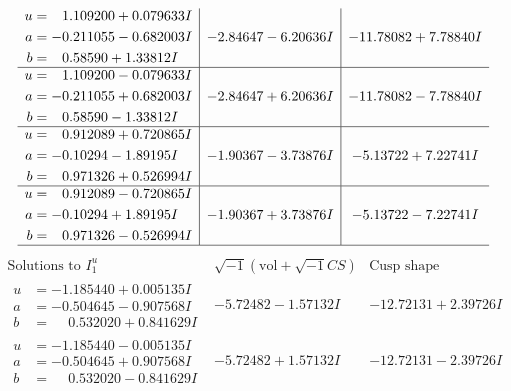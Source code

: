 \documentclass[1p]{elsarticle_modified}
\theoremstyle{definition}
\newcommand{\I}{\sqrt{-1}}
\begin{document}
$$\begin{array}{c|c|c}
\begin{aligned}
u &= \phantom{-}1.109200 + 0.079633 I \\
a &= -0.211055 - 0.682003 I \\
b &= \phantom{-}0.58590 + 1.33812 I\end{aligned}
 & -2.84647 - 6.20636 I & -11.78082 + 7.78840 I \\ \hline\begin{aligned}
u &= \phantom{-}1.109200 - 0.079633 I \\
a &= -0.211055 + 0.682003 I \\
b &= \phantom{-}0.58590 - 1.33812 I\end{aligned}
 & -2.84647 + 6.20636 I & -11.78082 - 7.78840 I \\ \hline\begin{aligned}
u &= \phantom{-}0.912089 + 0.720865 I \\
a &= -0.10294 - 1.89195 I \\
b &= \phantom{-}0.971326 + 0.526994 I\end{aligned}
 & -1.90367 - 3.73876 I & -5.13722 + 7.22741 I \\ \hline\begin{aligned}
u &= \phantom{-}0.912089 - 0.720865 I \\
a &= -0.10294 + 1.89195 I \\
b &= \phantom{-}0.971326 - 0.526994 I\end{aligned}
 & -1.90367 + 3.73876 I & -5.13722 - 7.22741 I\\
 \hline 
 \end{array}$$\newpage$$\begin{array}{c|c|c}  
\text{Solutions to }I^u_{1}& \I (\text{vol} + \sqrt{-1}CS) & \text{Cusp shape}\\
 \hline 
\begin{aligned}
u &= -1.185440 + 0.005135 I \\
a &= -0.504645 - 0.907568 I \\
b &= \phantom{-}0.532020 + 0.841629 I\end{aligned}
 & -5.72482 - 1.57132 I & -12.72131 + 2.39726 I \\ \hline\begin{aligned}
u &= -1.185440 - 0.005135 I \\
a &= -0.504645 + 0.907568 I \\
b &= \phantom{-}0.532020 - 0.841629 I\end{aligned}
 & -5.72482 + 1.57132 I & -12.72131 - 2.39726 I \\ \hline\begin{aligned}

\end{aligned}
\end{array}$$
\end{document}
